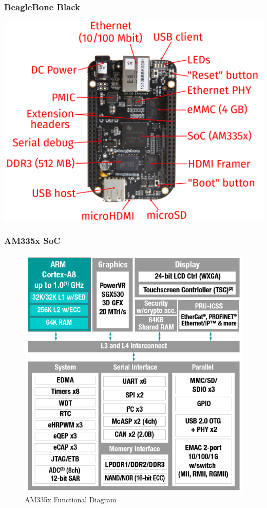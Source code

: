 \documentclass[aspectratio=169]{beamer}
\begin{document}
\begin{frame}
  \frametitle{BeagleBone Black}
  \begin{center}
    \includegraphics[scale=0.82]{images/bbb02.png}
  \end{center}
\end{frame}

\begin{frame}
  \frametitle{AM335x SoC}
  \begin{figure}
    \centering
    \includegraphics[scale=0.4]{images/am335x.png}
    \caption{AM335x Functional Diagram}
  \end{figure}
  \vspace*{-12mm} %
\end{frame}
\end{document}
